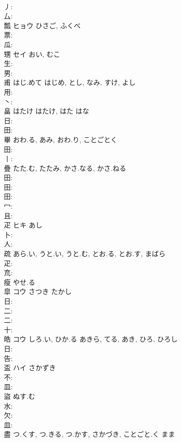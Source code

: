 \documentclass[8pt]{extreport}
\begin{document}
\begin{CJK}{UTF8}{min}
\\	丿: 
\\	厶: 
\\	瓢	ヒョウ	ひさご, ふくべ		
\\	票: 
\\	瓜: 
\\	甥	セイ	おい, むこ		
\\	生: 
\\	男: 
\\	甫		はじ.めて	はじめ, とし, なみ, すけ, よし		
\\	用: 
\\	丶: 
\\	畠	はたけ	はたけ, はた	はな	
\\	日: 
\\	田: 
\\	畢		おわ.る, あみ, おわ.り, ことごとく			
\\	田: 
\\	丨: 
\\	疊		たた.む, たたみ, かさ.なる, かさ.ねる				
\\	田: 
\\	田: 
\\	田: 
\\	冖: 
\\	且: 
\\	疋	ヒキ	あし		
\\	卜: 
\\	人: 
\\	疏		あら.い, うと.い, うと.む, とお.る, とお.す, まばら			
\\	疋: 
\\	㐬: 
\\	瘦		やせ.る				
\\	皐	コウ	さつき	たかし	
\\	日: 
\\	二: 
\\	二: 
\\	十: 
\\	皓	コウ	しろ.い, ひか.る	あきら, てる, あき, ひろ, ひろし	
\\	日: 
\\	告: 
\\	盃	ハイ	さかずき				
\\	不: 
\\	皿: 
\\	盜		ぬす.む				
\\	水: 
\\	欠: 
\\	皿: 
\\	盡		つ.くす, つ.きる, つ.かす, さかづき, ことごと.く	まま			

\end{CJK}
\end{document}
